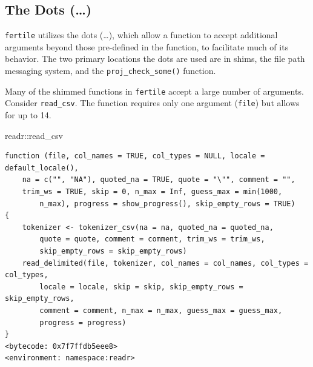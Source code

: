 \documentclass[12pt,twoside]{reedthesis}
\newenvironment{Shaded}{\begin{snugshade}}{\end{snugshade}}
\newcommand{\NormalTok}[1]{#1}
\newcommand{\SpecialCharTok}[1]{\textcolor[rgb]{0.00,0.00,0.00}{#1}}
\begin{document}
\hypertarget{the-dots}{%
\subsection{The Dots (\ldots)}\label{the-dots}}

\texttt{fertile} utilizes the dots (\ldots), which allow a function to accept additional arguments beyond those pre-defined in the function, to facilitate much of its behavior. The two primary locations the dots are used are in shims, the file path messaging system, and the \texttt{proj\_check\_some()} function.

Many of the shimmed functions in \texttt{fertile} accept a large number of arguments. Consider \texttt{read\_csv}. The function requires only one argument (\texttt{file}) but allows for up to 14.
\begin{Shaded}
\begin{Highlighting}[]
\NormalTok{readr}\SpecialCharTok{::}\NormalTok{read\_csv}
\end{Highlighting}
\end{Shaded}
\small
\begin{verbatim}
function (file, col_names = TRUE, col_types = NULL, locale = default_locale(), 
    na = c("", "NA"), quoted_na = TRUE, quote = "\"", comment = "", 
    trim_ws = TRUE, skip = 0, n_max = Inf, guess_max = min(1000, 
        n_max), progress = show_progress(), skip_empty_rows = TRUE) 
{
    tokenizer <- tokenizer_csv(na = na, quoted_na = quoted_na, 
        quote = quote, comment = comment, trim_ws = trim_ws, 
        skip_empty_rows = skip_empty_rows)
    read_delimited(file, tokenizer, col_names = col_names, col_types = col_types, 
        locale = locale, skip = skip, skip_empty_rows = skip_empty_rows, 
        comment = comment, n_max = n_max, guess_max = guess_max, 
        progress = progress)
}
<bytecode: 0x7f7ffdb5eee8>
<environment: namespace:readr>
\end{verbatim}
\normalsize
\end{document}
